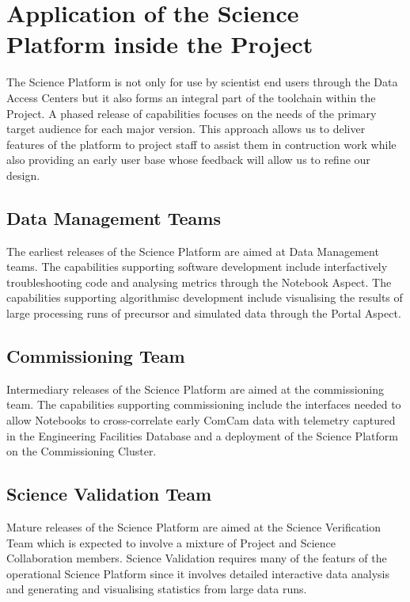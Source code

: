 \section{Application of the Science Platform inside the Project}\label{application-of-the-science-platform-inside-the-project}

The Science Platform is not only for use by scientist end users through the Data Access Centers but it also forms an integral part of the toolchain within the Project. A phased release of capabilities focuses on the needs of the primary target audience for each major version. This approach allows us to deliver features of the platform to project staff to assist them in contruction work while also providing an early user base whose feedback will allow us to refine our design. 

\subsection{Data Management Teams}\label{developer-support}

The earliest releases of the Science Platform are aimed at Data Management teams. The capabilities supporting software development include interfactively troubleshooting code and analysing metrics through the Notebook Aspect. The capabilities supporting algorithmisc development include visualising the results of large processing runs of precursor and simulated data through the Portal Aspect. 

\subsection{Commissioning Team}\label{commissioning}

Intermediary releases of the Science Platform are aimed at the commissioning team. The capabilities supporting commissioning include the interfaces needed to allow Notebooks to cross-correlate early ComCam data with telemetry captured in the Engineering Facilities Database and a deployment of the Science Platform on the Commissioning Cluster.

\subsection{Science Validation Team} 

Mature releases of the Science Platform are aimed at the Science Verification Team which is expected to involve a mixture of Project and Science Collaboration members. Science Validation requires many of the featurs of the operational Science Platform since it involves detailed interactive data analysis and generating and visualising statistics from large data runs.

